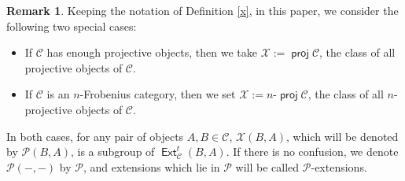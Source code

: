 \documentclass[11pt,a4paper]{amsart}
\newcommand{\C}{\mathscr{C} }
\newcommand{\p}{\mathfrak{p} }
\def\proj{\operatorname{\mathsf{proj}}}
\def\Ext{\operatorname{{\mathsf{Ext}}}}
\def\X{\mathcal{X}}
\def\p{\mathcal P}
\theoremstyle{definition}
\newtheorem{rem}[theorem]{Remark}
\theoremstyle{plain}
\theoremstyle{definition}
\numberwithin{equation}{section}
\begin{document}
\begin{rem}\label{ppp} Keeping the notation of Definition \ref{x}, in this paper, we consider the following two special cases:
\begin{itemize}
\item If $\C$ has enough projective objects, then we take $\X:=\proj\C$, the class of all projective objects of $\C$.
\item If $\C$ is an $n$-Frobenius category, then we set $\X:=n$-$\proj\C$, the class of all $n$-projective objects of $\C$.
\end{itemize}
In both cases, for any pair of objects $ A, B\in\C$, $\X(B, A)$, which will be denoted by $\p(B, A)$, is a subgroup of $\Ext^t_{\C}(B, A)$. If there is no confusion, we denote $\p(-, -)$  by $\p$, and extensions which lie in $\p$ will be called $\p$-extensions.
\end{rem}
\end{document}
